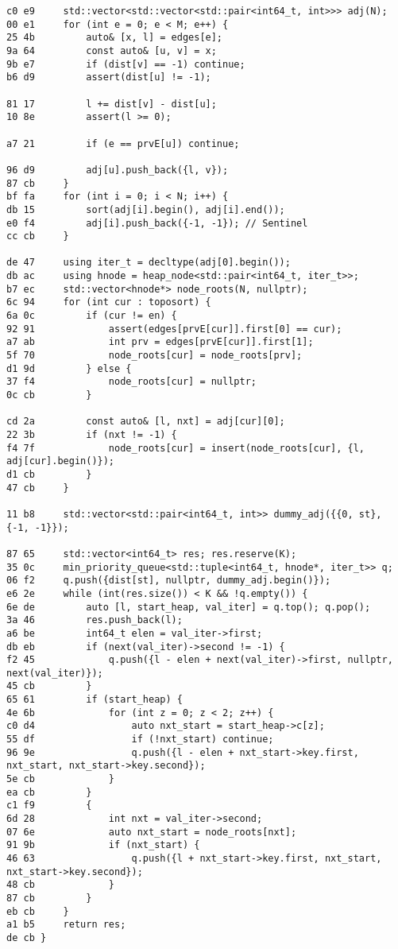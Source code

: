 \documentclass[11pt, a4paper, twoside]{article}
\begin{document}
\begin{lstlisting}
c0 e9     std::vector<std::vector<std::pair<int64_t, int>>> adj(N);
00 e1     for (int e = 0; e < M; e++) {
25 4b         auto& [x, l] = edges[e];
9a 64         const auto& [u, v] = x;
9b e7         if (dist[v] == -1) continue;
b6 d9         assert(dist[u] != -1);
      
81 17         l += dist[v] - dist[u];
10 8e         assert(l >= 0);
      
a7 21         if (e == prvE[u]) continue;
      
96 d9         adj[u].push_back({l, v});
87 cb     }
bf fa     for (int i = 0; i < N; i++) {
db 15         sort(adj[i].begin(), adj[i].end());
e0 f4         adj[i].push_back({-1, -1}); // Sentinel
cc cb     }
      
de 47     using iter_t = decltype(adj[0].begin());
db ac     using hnode = heap_node<std::pair<int64_t, iter_t>>;
b7 ec     std::vector<hnode*> node_roots(N, nullptr);
6c 94     for (int cur : toposort) {
6a 0c         if (cur != en) {
92 91             assert(edges[prvE[cur]].first[0] == cur);
a7 ab             int prv = edges[prvE[cur]].first[1];
5f 70             node_roots[cur] = node_roots[prv];
d1 9d         } else {
37 f4             node_roots[cur] = nullptr;
0c cb         }
      
cd 2a         const auto& [l, nxt] = adj[cur][0];
22 3b         if (nxt != -1) {
f4 7f             node_roots[cur] = insert(node_roots[cur], {l, adj[cur].begin()});
d1 cb         }
47 cb     }
      
11 b8     std::vector<std::pair<int64_t, int>> dummy_adj({{0, st}, {-1, -1}});
      
87 65     std::vector<int64_t> res; res.reserve(K);
35 0c     min_priority_queue<std::tuple<int64_t, hnode*, iter_t>> q;
06 f2     q.push({dist[st], nullptr, dummy_adj.begin()});
e6 2e     while (int(res.size()) < K && !q.empty()) {
6e de         auto [l, start_heap, val_iter] = q.top(); q.pop();
3a 46         res.push_back(l);
a6 be         int64_t elen = val_iter->first;
db eb         if (next(val_iter)->second != -1) {
f2 45             q.push({l - elen + next(val_iter)->first, nullptr, next(val_iter)});
45 cb         }
65 61         if (start_heap) {
4e 6b             for (int z = 0; z < 2; z++) {
c0 d4                 auto nxt_start = start_heap->c[z];
55 df                 if (!nxt_start) continue;
96 9e                 q.push({l - elen + nxt_start->key.first, nxt_start, nxt_start->key.second});
5e cb             }
ea cb         }
c1 f9         {
6d 28             int nxt = val_iter->second;
07 6e             auto nxt_start = node_roots[nxt];
91 9b             if (nxt_start) {
46 63                 q.push({l + nxt_start->key.first, nxt_start, nxt_start->key.second});
48 cb             }
87 cb         }
eb cb     }
a1 b5     return res;
de cb }
\end{lstlisting}
\end{document}
